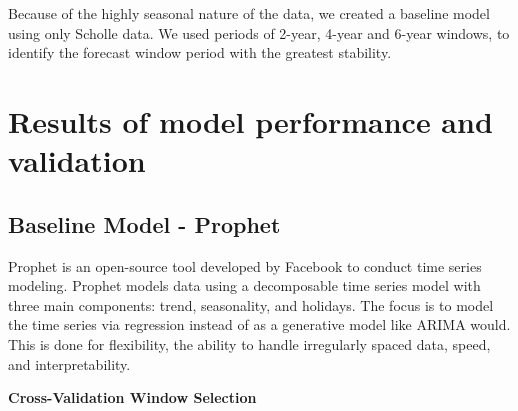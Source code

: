 \documentclass[12pt,oneside]{chicagocapstone}
\begin{document}
Because of the highly seasonal nature of the data, we created a baseline
model using only Scholle data. We used periods of 2-year, 4-year and
6-year windows, to identify the forecast window period with the greatest
stability.

\section*{Results of model performance and
validation}\label{results-of-model-performance-and-validation}

\subsection*{Baseline Model - Prophet}\label{baseline-model---prophet}

Prophet is an open-source tool developed by Facebook to conduct time
series modeling. Prophet models data using a decomposable time series
model with three main components: trend, seasonality, and holidays. The
focus is to model the time series via regression instead of as a
generative model like ARIMA would. This is done for flexibility, the
ability to handle irregularly spaced data, speed, and interpretability.

\textbf{Cross-Validation Window Selection}
\end{document}
